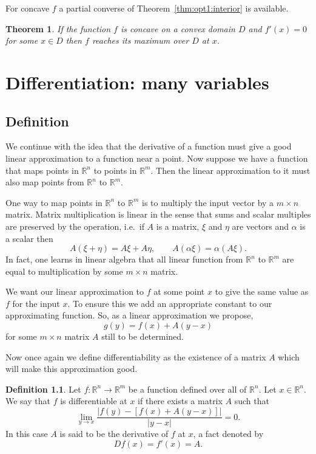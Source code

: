 \documentclass[11pt,reqno,openany]{amsbook}
\numberwithin{figure}{chapter}
\numberwithin{equation}{chapter}
\theoremstyle{plain}
\newtheorem{thm}{Theorem}[chapter]
\theoremstyle{definition}
\newtheorem{defn}{Definition}[chapter]
\renewcommand{\Re}{\mathbb{R}}
\begin{document}
For concave $f$ a partial converse of
Theorem~\ref{thm:opt1:interior} is available.

\begin{thm}
  If the function $f$ is concave on a convex domain $D$ and
  $f'(x)=0$ for some $x \in D$ then $f$ reaches its maximum
  over $D$ at $x$.
\end{thm}

\chapter{Differentiation: many variables}
\section{Definition}
We continue with the idea that the derivative of a function
must give a good linear approximation to a function near a
point. Now suppose we have a function that maps points in
$\Re^n$ to points in $\Re^m$. Then the linear approximation
to it must also map points from $\Re^n$ to $\Re^m$. 

One way to map points in $\Re^n$ to $\Re^m$ is to multiply
the input vector by a $m \times n$ matrix. Matrix
multiplication is linear in the sense that sums and scalar
multiples are preserved by the operation, i.e.\ if $A$ is a
matrix, $\xi$ and $\eta$ are vectors and $\alpha$ is a
scalar then
\[A(\xi+\eta)=A\xi+A\eta,\qquad
A(\alpha\xi)=\alpha(A\xi).\]
In fact, one learns in linear algebra that all linear
function from $\Re^n$ to $\Re^m$ are equal to multiplication
by some $m \times n$ matrix.

We want our linear approximation to $f$ at some point $x$ to
give the same value as $f$ for the input $x$. To ensure this
we add an appropriate constant to our approximating
function. So, as a linear approximation we propose,
\[g(y) = f(x) + A(y-x)\]
for some $m \times n$ matrix $A$ still to be determined.

Now once again we define differentiability as the existence
of a matrix $A$ which will make this approximation good.

\begin{defn}\label{defn:diff_n}
  Let $f\colon \Re^n \to \Re^m$ be a function defined over
  all of $\Re^n$. Let $x \in \Re^n$. We say that $f$ is
  differentiable at $x$ if there exists a matrix $A$ such
  that
  \begin{equation}\label{eq:diffn:linapprox}
    \lim_{y \to x}
    \frac{\lvert f(y)-[f(x)+A(y-x)]\rvert}
    {\lvert y-x \rvert}=0.
  \end{equation}
  In this case $A$ is said to be the derivative of $f$ at
  $x$, a fact denoted by
  \[Df(x)=f'(x)=A.\]
\end{defn}
\end{document}
